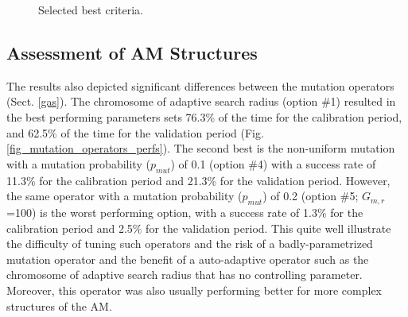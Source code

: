 \documentclass[draft]{agujournal2019}
\begin{document}
\begin{figure}[hbt]
	\noindent{}
	\caption{Selected best criteria.}
	\label{fig_criteria}
\end{figure}

\subsection{Assessment of AM Structures}
\label{structures}




The results also depicted significant differences between the mutation operators (Sect. \ref{gas}). The chromosome of adaptive search radius (option \#1) resulted in the best performing parameters sets 76.3\% of the time for the calibration period, and 62.5\% of the time for the validation period (Fig. \ref{fig_mutation_operators_perfs}).  The second best is the non-uniform mutation with a mutation probability ($p_{mut}$) of 0.1 (option \#4) with a success rate of 11.3\% for the calibration period and 21.3\% for the validation period. However, the same operator with a  mutation probability ($p_{mut}$) of 0.2 (option \#5; $G_{m,r}$=100) is the worst performing option, with a success rate of 1.3\% for the calibration period and 2.5\% for the validation period. This quite well illustrate the difficulty of tuning such operators and the risk of a badly-parametrized mutation operator and the benefit of a auto-adaptive operator such as the chromosome of adaptive search radius that has no controlling parameter. Moreover, this operator was also usually performing better for more complex structures of the AM.
\end{document}
